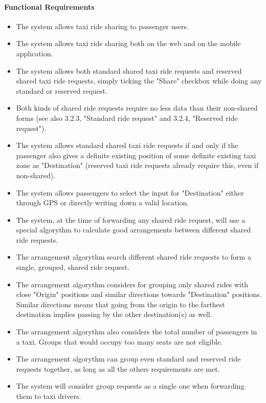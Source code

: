 	\paragraph{Functional Requirements}
		\begin{itemize}
			\item The system allows taxi ride sharing to passenger users.
			\item The system allows taxi ride sharing both on the web and on the mobile application.
			\item The system allows both standard shared taxi ride requests and reserved shared taxi ride requests, simply ticking the "Share" checkbox while doing any standard or reserved request.
			\item Both kinds of shared ride requests require no less data than their non-shared forms (see also 3.2.3, "Standard ride request" and 3.2.4, "Reserved ride request").
			\item The system allows standard shared taxi ride requests if and only if the passenger also gives a definite existing position of some definite existing taxi zone as "Destination" (reserved taxi ride requests already require this, even if non-shared).
			\item The system allows passengers to select the input for "Destination" either through GPS or directly writing down a valid location.
			\item The system, at the time of forwarding any shared ride request, will use a special algorythm to calculate good arrangements between different shared ride requests.
			\item The arrangement algorythm search different shared ride requests to form a single, grouped, shared ride request.
			\item The arrangement algorythm considers for grouping only shared rides with close "Origin" positions and similar directions towards "Destination" positions. Similar directions means that going from the origin to the farthest destination implies passing by the other destination(s) as well.
			\item The arrangement algorythm also considers the total number of passengers in a taxi. Groups that would occupy too many seats are not eligible.
			\item The arrangement algorythm can group even standard and reserved ride requests together, as long as all the others requirements are met.
			\item The system will consider group requests as a single one when forwarding them to taxi drivers.

\end{itemize}
